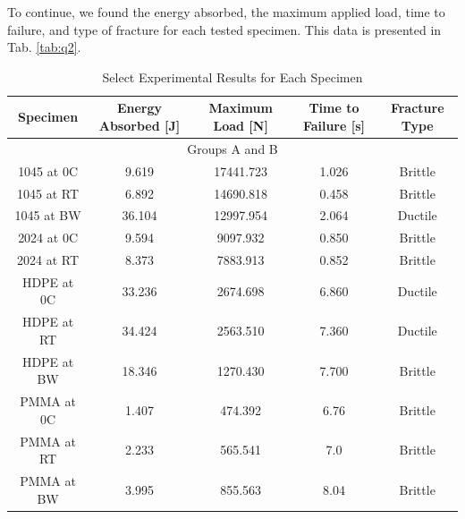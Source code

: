 \documentclass{article}
\begin{document}
\newpage
To continue, we found the energy absorbed, the maximum applied load, time to failure, and type of fracture for each tested specimen. This data is presented in Tab. \ref{tab:q2}. 

\begin{table}[!h!]
    \centering
    \caption{Select Experimental Results for Each Specimen }
    \renewcommand{\arraystretch}{1.5}
    \begin{tabular}{|c|c|c|c|c|}
        \toprule
        \hline
        Specimen & Energy Absorbed [J]& Maximum Load [N]& Time to Failure [s]& Fracture Type\\
        \toprule

        \bottomrule
        \multicolumn{5}{|c|}{Groups A and B} \\
        \toprule
        \bottomrule
        1045 at 0C & 9.619 & 17441.723 & 1.026 & Brittle\\ 
        \hline
        1045 at RT & 6.892 & 14690.818 & 0.458 & Brittle\\ 
        \hline
        1045 at BW & 36.104 & 12997.954 & 2.064 & Ductile\\ 
        \hline
        2024 at 0C & 9.594 & 9097.932 & 0.850 & Brittle \\ 
        \hline
        2024 at RT & 8.373 & 7883.913 & 0.852 & Brittle\\ 
        \hline
        HDPE at 0C & 33.236 & 2674.698 & 6.860 & Ductile \\ 
        \hline
        HDPE at RT & 34.424 & 2563.510 & 7.360 & Ductile\\ 
        \hline
        HDPE at BW & 18.346 & 1270.430 & 7.700 & Brittle \\ 
        \hline
        PMMA at 0C & 1.407 & 474.392 & 6.76 & Brittle\\ 
        \hline
        PMMA at RT & 2.233 & 565.541 & 7.0 & Brittle \\ 
        \hline
        PMMA at BW & 3.995 & 855.563 & 8.04 & Brittle\\ 
        \toprule
        

\end{tabular}
\end{table}
\end{document}
